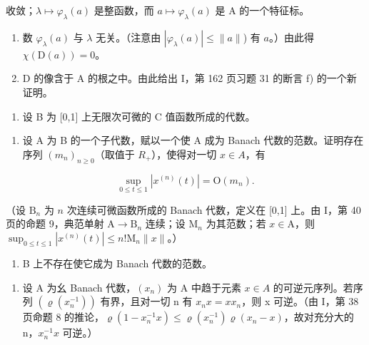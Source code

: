 收敛；\(\lambda \mapsto \varphi_{\lambda}(a)\) 是整函数，而 \(a \mapsto \varphi_{\lambda}(a)\) 是 A 的一个特征标。

\begin{enumerate}
\def\labelenumi{\alph{enumi})}
\setcounter{enumi}{1}
\item
  数 \(\varphi_{\lambda}(a)\) 与 \(\lambda\) 无关。（注意由 \(|\varphi_{\lambda}(a)| \leqslant \|a\|\)) 有 \(a\)。）由此得 \(\chi(\mathrm{D}(a)) = 0\)。
\item
  D 的像含于 A 的根之中。由此给出 I，第 162 页习题 31 的断言 f) 的一个新证明。
\end{enumerate}

\begin{enumerate}
\def\labelenumi{\arabic{enumi})}
\setcounter{enumi}{10}
\tightlist
\item
  设 B 为 {[}0,1{]} 上无限次可微的 C 值函数所成的代数。
\end{enumerate}

\begin{enumerate}
\def\labelenumi{\alph{enumi})}
\tightlist
\item
  设 A 为 B 的一个子代数，赋以一个使 A 成为 Banach 代数的范数。证明存在序列 \((m_{n})_{n\geqslant0}\)（取值于 \(R_{+}\)），使得对一切 \(x\in A\)，有
\end{enumerate}

\[
\sup _ {0 \leqslant t \leqslant 1} | x ^ {(n)} (t) | = \mathrm{O} (m _ {n}).
\]

（设 \(\mathrm{B}_n\) 为 \(n\) 次连续可微函数所成的 Banach 代数，定义在 {[}0,1{]} 上。由 I，第 40 页的命题 9，典范单射 \(\mathrm{A} \to \mathrm{B}_n\) 连续；设 \(\mathrm{M}_n\) 为其范数；若 \(x \in \mathrm{A}\)，则 \(\sup_{0 \leq t \leq 1} |x^{(n)}(t)| \leqslant n!\mathrm{M}_n \| x\|\)。）

\begin{enumerate}
\def\labelenumi{\alph{enumi})}
\setcounter{enumi}{1}
\tightlist
\item
  B 上不存在使它成为 Banach 代数的范数。
\end{enumerate}

\begin{enumerate}
\def\labelenumi{\arabic{enumi})}
\setcounter{enumi}{11}
\tightlist
\item
  设 A 为幺 Banach 代数，\((x_{n})\) 为 A 中趋于元素 \(x \in A\) 的可逆元序列。若序列 \((\varrho(x_{n}^{-1}))\) 有界，且对一切 n 有 \(x_{n}x = xx_{n}\)，则 x 可逆。（由 I，第 38 页命题 8 的推论，\(\varrho(1 - x_{n}^{-1}x) \leqslant \varrho(x_{n}^{-1})\varrho(x_{n} - x)\)，故对充分大的 n，\(x_{n}^{-1}x\) 可逆。）
\end{enumerate}

